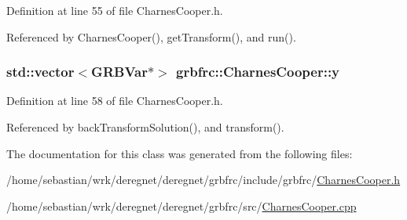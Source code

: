 Definition at line 55 of file Charnes\+Cooper.\+h.



Referenced by Charnes\+Cooper(), get\+Transform(), and run().

\subsubsection[{\texorpdfstring{y}{y}}]{\setlength{\rightskip}{0pt plus 5cm}std\+::vector$<$G\+R\+B\+Var$\ast$$>$ grbfrc\+::\+Charnes\+Cooper\+::y\hspace{0.3cm}{\ttfamily [private]}}\hypertarget{classgrbfrc_1_1CharnesCooper_a19e3874ce0b6242d4b7f8491bfae472f}{}\label{classgrbfrc_1_1CharnesCooper_a19e3874ce0b6242d4b7f8491bfae472f}


Definition at line 58 of file Charnes\+Cooper.\+h.



Referenced by back\+Transform\+Solution(), and transform().



The documentation for this class was generated from the following files\+:\begin{DoxyCompactItemize}
\item 
/home/sebastian/wrk/deregnet/deregnet/grbfrc/include/grbfrc/\hyperlink{CharnesCooper_8h}{Charnes\+Cooper.\+h}\item 
/home/sebastian/wrk/deregnet/deregnet/grbfrc/src/\hyperlink{CharnesCooper_8cpp}{Charnes\+Cooper.\+cpp}\end{DoxyCompactItemize}
